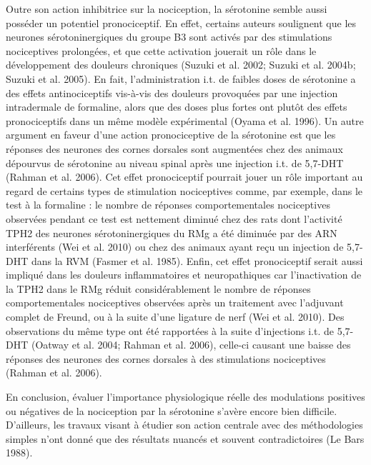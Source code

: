 \documentclass[a4paper,12pt,twoside]{report}
\begin{document}
\bigskip

Outre son action inhibitrice sur la nociception, la sérotonine semble aussi posséder un potentiel pronociceptif. En effet, certains auteurs soulignent que les neurones sérotoninergiques du groupe B3 sont activés par des stimulations nociceptives prolongées, et que cette activation jouerait un rôle dans le développement des douleurs chroniques (Suzuki et al. 2002; Suzuki et al. 2004b; Suzuki et al. 2005). En fait, l’administration i.t. de faibles doses de sérotonine a des effets antinociceptifs vis-à-vis des douleurs provoquées par une injection intradermale de formaline, alors que des doses plus fortes ont plutôt des effets pronociceptifs dans un même modèle expérimental (Oyama et al. 1996). Un autre argument en faveur d’une action pronociceptive de la sérotonine est que les réponses des neurones des cornes dorsales sont augmentées chez des animaux dépourvus de sérotonine au niveau spinal après une injection i.t. de 5,7-DHT (Rahman et al. 2006). Cet effet pronociceptif pourrait jouer un rôle important au regard de certains types de stimulation nociceptives comme, par exemple, dans le test à la formaline : le nombre de réponses comportementales nociceptives observées pendant ce test est nettement diminué chez des rats dont l’activité TPH2 des neurones sérotoninergiques du RMg a été diminuée par des ARN interférents (Wei et al. 2010) ou chez des animaux ayant reçu un injection de 5,7-DHT dans la RVM (Fasmer et al. 1985). Enfin, cet effet pronociceptif serait aussi impliqué dans les douleurs inflammatoires et neuropathiques car l’inactivation de la TPH2 dans le RMg réduit considérablement le nombre de réponses comportementales nociceptives observées après un traitement avec l’adjuvant complet de Freund, ou à la suite d’une ligature de nerf (Wei et al. 2010). Des observations du même type ont été rapportées à la suite d’injections i.t. de 5,7-DHT (Oatway et al. 2004; Rahman et al. 2006), celle-ci causant une baisse des réponses des neurones des cornes dorsales à des stimulations nociceptives (Rahman et al. 2006).

\bigskip

En conclusion, évaluer l’importance physiologique réelle des modulations positives ou négatives de la nociception par la sérotonine s’avère encore bien difficile. D’ailleurs, les travaux visant à étudier son action centrale avec des méthodologies simples n’ont donné que des résultats nuancés et souvent contradictoires (Le Bars 1988).
 
\end{document}
